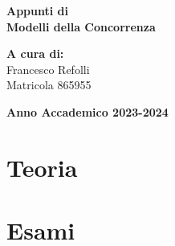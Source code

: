 \documentclass[a4paper,12pt,oneside]{book}
\begin{document}
    
    \begin{titlepage}
        
	\vspace{40mm}
        
	\begin{center}
            {\LARGE{
                    \textbf{Appunti di \\ Modelli della Concorrenza}
                    \par
            }}
        \end{center}
        
        \vspace{50mm}

        \begin{flushright}
            {\large \textbf{A cura di:}} \\
            \large{Francesco Refolli} \\
            \large{Matricola 865955} 
        \end{flushright}
        
        \vspace{40mm}
        \begin{center}
            {\large{\bf Anno Accademico 2023-2024}}
        \end{center}

        \restoregeometry
        
    \end{titlepage}
    
    \printindex
    
    \part{Teoria}
    
    
    
    
    
    \part{Esami}
    
\end{document}
